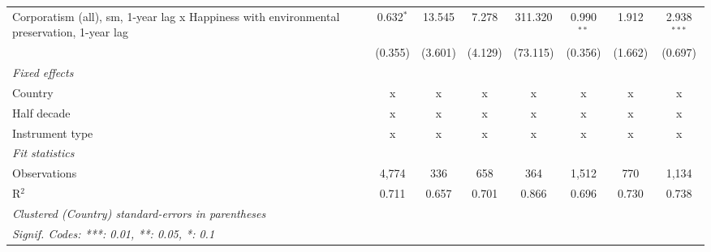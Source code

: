 \begin{table}[htbp]
\begin{tabular}{lccccccc}
      Corporatism (all), sm, 1-year lag x Happiness with environmental preservation, 1-year lag & 0.632$^{*}$   & 13.545                    & 7.278          & 311.320          & 0.990$^{**}$    & 1.912           & 2.938$^{***}$\\   
                                                                                                & (0.355)       & (3.601)                   & (4.129)        & (73.115)         & (0.356)         & (1.662)         & (0.697)\\   
      \emph{Fixed effects}\\
      Country                                                                                   & x             & x                         & x              & x                & x               & x               & x\\  
      Half decade                                                                               & x             & x                         & x              & x                & x               & x               & x\\  
      Instrument type                                                                           & x             & x                         & x              & x                & x               & x               & x\\  
      \midrule \emph{Fit statistics}\\
      Observations                                                                              & 4,774         & 336                       & 658            & 364              & 1,512           & 770             & 1,134\\  
      R$^2$                                                                                     & 0.711         & 0.657                     & 0.701          & 0.866            & 0.696           & 0.730           & 0.738\\  
      \midrule
      \multicolumn{8}{l}{\emph{Clustered (Country) standard-errors in parentheses}}\\
      \multicolumn{8}{l}{\emph{Signif. Codes: ***: 0.01, **: 0.05, *: 0.1}}\\
   \end{tabular}
\end{table}


